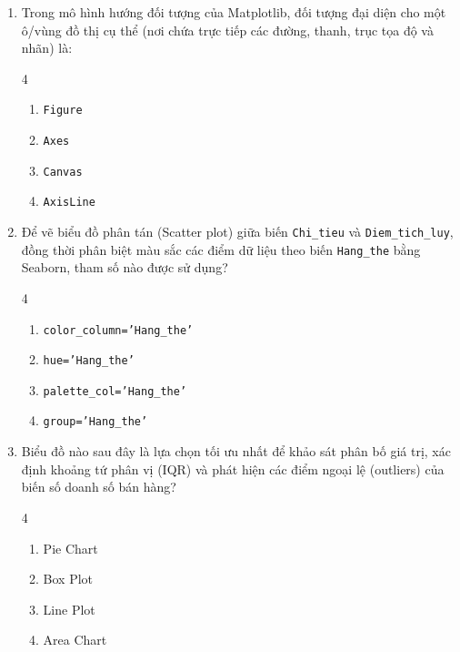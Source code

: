 \documentclass[11pt,a4paper]{article}
\begin{document}
\newpage
\begin{enumerate}[leftmargin=*,itemsep=2.5pt,resume]

\item Trong mô hình hướng đối tượng của Matplotlib, đối tượng đại diện cho một ô/vùng đồ thị cụ thể (nơi chứa trực tiếp các đường, thanh, trục tọa độ và nhãn) là:
\begin{multicols}{4}
\begin{enumerate}[label=\Alph*.]
  \item \texttt{Figure}
  \item \texttt{Axes}
  \item \texttt{Canvas}
  \item \texttt{AxisLine}
\end{enumerate}
\end{multicols}

\item Để vẽ biểu đồ phân tán (Scatter plot) giữa biến \texttt{Chi\_tieu} và \texttt{Diem\_tich\_luy}, đồng thời phân biệt màu sắc các điểm dữ liệu theo biến \texttt{Hang\_the} bằng Seaborn, tham số nào được sử dụng?
\begin{multicols}{4}
\begin{enumerate}[label=\Alph*.]
  \item \texttt{color\_column='Hang\_the'}
  \item \texttt{hue='Hang\_the'}
  \item \texttt{palette\_col='Hang\_the'}
  \item \texttt{group='Hang\_the'}
\end{enumerate}
\end{multicols}

\item Biểu đồ nào sau đây là lựa chọn tối ưu nhất để khảo sát phân bố giá trị, xác định khoảng tứ phân vị (IQR) và phát hiện các điểm ngoại lệ (outliers) của biến số doanh số bán hàng?
\begin{multicols}{4}
\begin{enumerate}[label=\Alph*.]
  \item Pie Chart
  \item Box Plot
  \item Line Plot
  \item Area Chart
\end{enumerate}
\end{multicols}


\end{enumerate}
\end{document}
